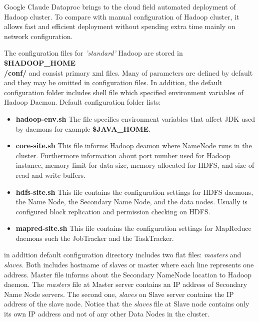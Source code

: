 \documentclass[a4paper,12pt,oneside]{report}
\begin{document}
Google Claude Dataproc brings to the cloud field automated deployment of Hadoop cluster. To compare 
with manual configuration of Hadoop cluster, it allows fast and efficient deployment without spending 
extra time mainly on network configuration.

The configuration files for \textit{'standard'} Hadoop are stored in \textbf{\$HADOOP\_HOME\\/conf/} 
and consist  primary xml files. Many of parameters are defined by default and they may be omitted in configuration files. In addition, the default 
configuration folder  includes shell file which specified environment variables of Hadoop Daemon. Default configuration folder lists:
\begin{itemize}\label{conf_files}
\item \textbf{hadoop-env.sh} The file specifies environment variables that affect JDK used by daemons
for example \textbf{\$JAVA\_HOME}.
\item \textbf{core-site.sh}   This file informs Hadoop deamon where NameNode runs in the cluster. Furthermore 
information about port number used for Hadoop instance, memory limit for data size,  memory allocated for HDFS, and size of read and write buffers.
\item \textbf{hdfs-site.sh}  This file contains the configuration settings for HDFS daemons, the Name 
Node, the Secondary Name Node, and the data nodes. Usually is configured block replication and permission checking on HDFS. 
\item \textbf{mapred-site.sh}  This file contains the configuration settings for MapReduce daemons 
such the JobTracker and the TaskTracker.
\end{itemize}

in addition default configuration directory includes two flat files: \textit{masters} and \textit{slaves}. 
Both includes hostname of slaves or master where each line represents one address. 
Master file informs about the Secondary NameNode location to Hadoop daemon. The \textit{masters} 
file at Master server contains an IP address of Secondary Name Node servers.
The second one, \textit{slaves} on Slave server contains the IP address of the slave node. Notice 
that the \textit{slaves} file at Slave node contains only its own IP address and not of any other Data Nodes in the cluster.
\end{document}

